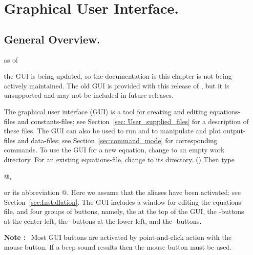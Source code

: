\chapter{ Graphical User Interface.} \label{ch:GUI}
\section{ General Overview.} \label{sec:GUI_Overview}
  as of \date{\today} the GUI is being updated, so the
documentation is this chapter is not being actively maintained.
The old GUI is provided with this release of \AUTO, but it is unsupported
and may not be included in future releases.

The \AUTOold graphical user interface (GUI) is a tool
for creating and editing equations-files and constants-files;
see Section~\ref{sec: User_supplied_files}
 for a description of these files.
The GUI can also be used to run \AUTO and to manipulate and plot
output-files and data-files; 
see Section~\ref{sec:command_mode} for corresponding commands.
To use the GUI for a new equation, change to an empty work directory.
For an existing equations-file, change to its directory.
()
Then type 

\centerline { @, }

or its abbreviation @.
Here we assume that the \AUTO aliases have been activated; 
see Section~\ref{sec:Installation}.
The GUI includes a window for editing the equations-file,
and four groups of buttons, namely,
the  at the top of the GUI,
the -buttons at the center-left,
the -buttons at the lower left,
and the -buttons.

{\bf Note :}~
Most GUI buttons are activated by point-and-click action with 
the  mouse button. 
If a beep sound results then the  mouse button must be used. 

